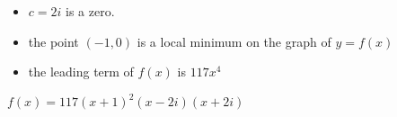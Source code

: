 {\begin{itemize}

\item $c=2i$ is a zero.
\item the point $(-1,0)$ is a local minimum on the graph of $y=f(x)$ 
\item the leading term of $f(x)$ is $117x^4$

\end{itemize}}
{$f(x) = 117(x+1)^2(x-2i)(x+2i)$}